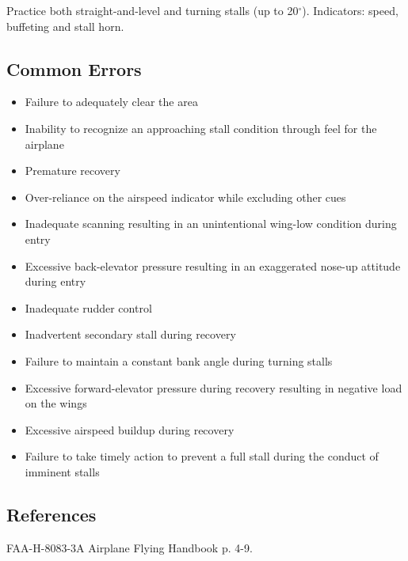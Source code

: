 Practice both straight-and-level and turning stalls (up to 20$^\circ$).
Indicators: speed, buffeting and stall horn.

\subsection{Common Errors}

\begin{itemize}
  \item Failure to adequately clear the area
  \item Inability to recognize an approaching stall condition through feel for
    the airplane
  \item Premature recovery
  \item Over-reliance on the airspeed indicator while excluding other cues
  \item Inadequate scanning resulting in an unintentional wing-low condition
    during entry
  \item Excessive back-elevator pressure resulting in an exaggerated nose-up
    attitude during entry
  \item Inadequate rudder control
  \item Inadvertent secondary stall during recovery
  \item Failure to maintain a constant bank angle during turning stalls
  \item Excessive forward-elevator pressure during recovery resulting in
    negative load on the wings
  \item Excessive airspeed buildup during recovery
  \item Failure to take timely action to prevent a full stall during the
    conduct of imminent stalls
\end{itemize}

\subsection{References}

FAA-H-8083-3A Airplane Flying Handbook p. 4-9.

